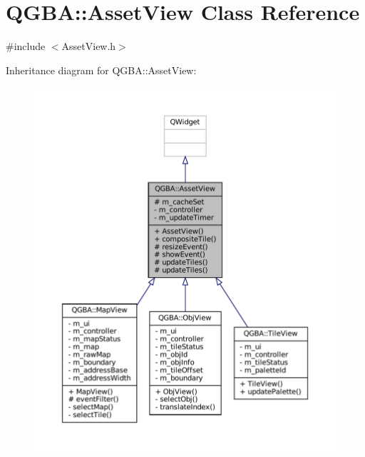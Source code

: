 \hypertarget{class_q_g_b_a_1_1_asset_view}{}\section{Q\+G\+BA\+:\+:Asset\+View Class Reference}
\label{class_q_g_b_a_1_1_asset_view}


{\ttfamily \#include $<$Asset\+View.\+h$>$}



Inheritance diagram for Q\+G\+BA\+:\+:Asset\+View\+:
\nopagebreak
\begin{figure}[H]
\begin{center}
\leavevmode
\includegraphics[width=350pt]{class_q_g_b_a_1_1_asset_view__inherit__graph}
\end{center}
\end{figure}


